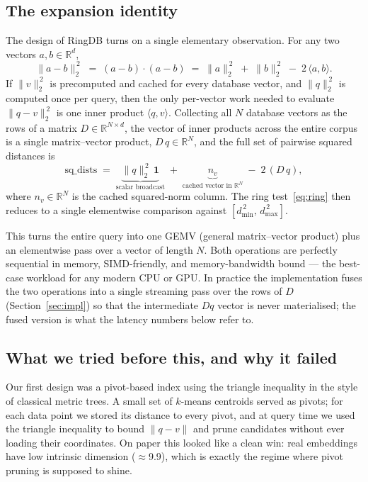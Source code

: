 \documentclass[11pt,a4paper]{article}
\begin{document}
\subsection{The expansion identity}
The design of RingDB turns on a single elementary observation. For
any two vectors $a, b \in \mathbb{R}^{d}$,
\begin{equation}
  \|a - b\|_{2}^{\,2}
  \;=\; (a - b) \cdot (a - b)
  \;=\; \|a\|_{2}^{\,2} \;+\; \|b\|_{2}^{\,2}
  \;-\; 2\,\langle a, b\rangle.
  \label{eq:expansion}
\end{equation}
If $\|v\|_{2}^{\,2}$ is precomputed and cached for every database
vector, and $\|q\|_{2}^{\,2}$ is computed once per query, then the
only per-vector work needed to evaluate $\|q - v\|_{2}^{\,2}$ is one
inner product $\langle q, v\rangle$. Collecting all $N$ database
vectors as the rows of a matrix
$D \in \mathbb{R}^{N \times d}$, the vector of inner products across
the entire corpus is a single matrix--vector product,
$D\,q \in \mathbb{R}^{N}$, and the full set of pairwise squared
distances is
\[
  \mathrm{sq\_dists}
  \;=\; \underbrace{\|q\|_{2}^{\,2}\,\mathbf{1}}_{\text{scalar broadcast}}
  \;+\; \underbrace{n_{v}}_{\text{cached vector in } \mathbb{R}^{N}}
  \;-\; 2\,(D\,q),
\]
where $n_{v} \in \mathbb{R}^{N}$ is the cached squared-norm column.
The ring test~\eqref{eq:ring} then reduces to a single elementwise
comparison against
$[d_\text{min}^{\,2},\,d_\text{max}^{\,2}]$.

This turns the entire query into one GEMV (general matrix--vector
product) plus an elementwise pass over a vector of length $N$. Both
operations are perfectly sequential in memory, SIMD-friendly, and
memory-bandwidth bound --- the best-case workload for any modern CPU
or GPU. In practice the implementation fuses the two operations into
a single streaming pass over the rows of $D$ (Section~\ref{sec:impl})
so that the intermediate $Dq$ vector is never materialised; the fused
version is what the latency numbers below refer to.

\subsection{What we tried before this, and why it failed}
Our first design was a pivot-based index using the triangle
inequality in the style of classical metric trees. A small set of
$k$-means centroids served as pivots; for each data point we stored
its distance to every pivot, and at query time we used the triangle
inequality to bound $\|q - v\|$ and prune candidates without ever
loading their coordinates. On paper this looked like a clean win:
real embeddings have low intrinsic dimension ($\approx$9.9), which
is exactly the regime where pivot pruning is supposed to shine.
\end{document}
